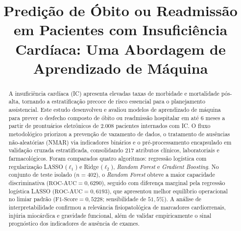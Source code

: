 \documentclass[conference]{IEEEtran}
\begin{document}
\title{Predição de Óbito ou Readmissão em Pacientes com Insuficiência Cardíaca: Uma Abordagem de Aprendizado de Máquina}

\author{
\and
{}
}

\maketitle

\begin{abstract}
A insuficiência cardíaca (IC) apresenta elevadas taxas de morbidade e mortalidade pós-alta, tornando a estratificação precoce de risco essencial para o planejamento assistencial. Este estudo desenvolveu e avaliou modelos de aprendizado de máquina para prever o desfecho composto de óbito ou readmissão hospitalar em até 6 meses a partir de prontuários eletrônicos de 2.008 pacientes internados com IC. O fluxo metodológico priorizou a prevenção de vazamento de dados, o tratamento de ausências não-aleatórias (NMAR) via indicadores binários e o pré-processamento encapsulado em validação cruzada estratificada, consolidando 217 atributos clínicos, laboratoriais e farmacológicos. Foram comparados quatro algoritmos: regressão logística com regularização LASSO ($\ell_1$) e Ridge ($\ell_2$), \textit{Random Forest} e \textit{Gradient Boosting}. No conjunto de teste isolado ($n = 402$), o \textit{Random Forest} obteve a maior capacidade discriminativa ($\text{ROC-AUC} = 0,6290$), seguido com diferença marginal pela regressão logística LASSO ($\text{ROC-AUC} = 0,6193$), que apresentou melhor equilíbrio operacional no limiar padrão ($\text{F1-Score} = 0,5228$; sensibilidade de $51,5\%$). A análise de interpretabilidade confirmou a relevância fisiopatológica de marcadores cardiorrenais, injúria miocárdica e gravidade funcional, além de validar empiricamente o sinal prognóstico dos indicadores de ausência de exames.
\end{abstract}
\end{document}
